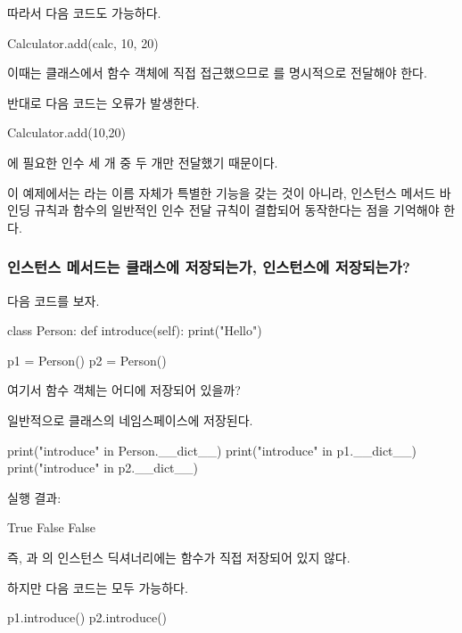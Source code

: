 따라서 다음 코드도 가능하다.

\begin{dhkcode}
Calculator.add(calc, 10, 20)
\end{dhkcode}

이때는 클래스에서 함수 객체에 직접 접근했으므로 를 명시적으로 전달해야 한다.

반대로 다음 코드는 오류가 발생한다.

\begin{dhkcode}
Calculator.add(10,20)
\end{dhkcode}

에 필요한 인수 세 개 중 두 개만 전달했기 때문이다.

이 예제에서는 라는 이름 자체가 특별한 기능을 갖는 것이 아니라, 인스턴스 메서드 바인딩 규칙과 함수의 일반적인 인수 전달 규칙이 결합되어 동작한다는 점을 기억해야 한다.

\subsubsection{인스턴스 메서드는 클래스에 저장되는가, 인스턴스에 저장되는가?}

다음 코드를 보자.

\begin{dhkcode}
class Person:
    def introduce(self):
        print("Hello")


p1 = Person()
p2 = Person()
\end{dhkcode}

여기서  함수 객체는 어디에 저장되어 있을까?

일반적으로 클래스의 네임스페이스에 저장된다.

\begin{dhkcode}
print("introduce" in Person.__dict__)
print("introduce" in p1.__dict__)
print("introduce" in p2.__dict__)
\end{dhkcode}

실행 결과:

\begin{dhkzsh}
True
False
False
\end{dhkzsh}

즉, 과 의 인스턴스 딕셔너리에는  함수가 직접 저장되어 있지 않다.

하지만 다음 코드는 모두 가능하다.

\begin{dhkcode}
p1.introduce()
p2.introduce()
\end{dhkcode}

